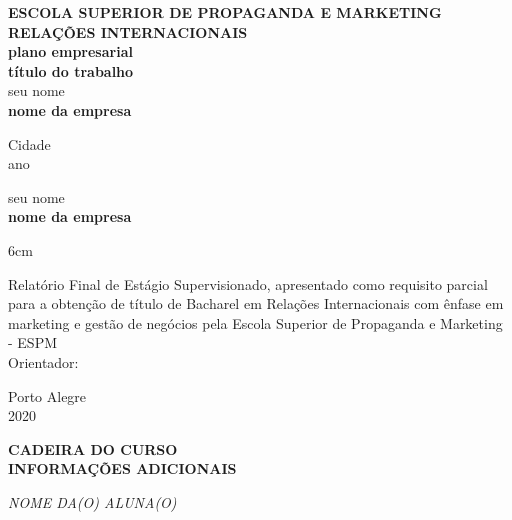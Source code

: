 \documentclass[a4paper]{article}
\begin{document}
\begin{titlepage}


\begin{center}
\large{\textbf{ESCOLA SUPERIOR DE PROPAGANDA E MARKETING}}\\[0.2cm]
\large{\textbf{RELAÇÕES INTERNACIONAIS}}\\[4cm]
\large{\textbf{plano empresarial}}\\[3cm]
\large\textbf{título do trabalho}\\[3cm]
\large{seu nome}\\[4cm]
%      
\large {\textbf{nome da empresa}}


\vfill
\large{Cidade}\\
ano
\end{center}
\end{titlepage}


\begin{titlepage}


\begin{center}
\large{seu nome}\\[8cm]

\large{\textbf{nome da empresa}}\\[4cm]

\begin{adjustwidth}{6cm}{}


{Relatório Final de Estágio Supervisionado, apresentado como requisito parcial para a obtenção de título de Bacharel em Relações Internacionais com ênfase em marketing e gestão de negócios pela Escola Superior de Propaganda e Marketing - ESPM}\\[1cm] %
Orientador: 

\end{adjustwidth}{}{}


\vfill
\large{Porto Alegre}\\
2020
\end{center}
\end{titlepage}

\begin{center}
\textbf{CADEIRA DO CURSO}\\
\textbf{INFORMAÇÕES ADICIONAIS}\\
\end{center}
\begin{flushright}
\textit{{NOME DA(O) ALUNA(O)}}%
\end{flushright}
\end{document}
